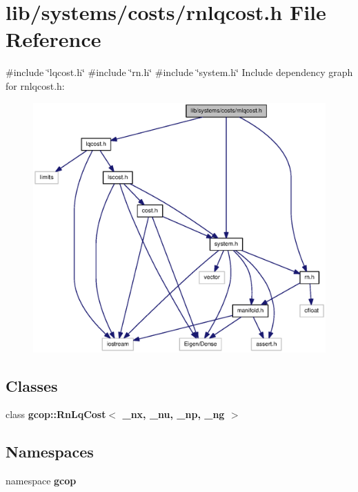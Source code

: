 \section{lib/systems/costs/rnlqcost.h \-File \-Reference}
\label{rnlqcost_8h}
{\ttfamily \#include \char`\"{}lqcost.\-h\char`\"{}}\*
{\ttfamily \#include \char`\"{}rn.\-h\char`\"{}}\*
{\ttfamily \#include \char`\"{}system.\-h\char`\"{}}\*
\-Include dependency graph for rnlqcost.\-h\-:\nopagebreak
\begin{figure}[H]
\begin{center}
\leavevmode
\includegraphics[width=350pt]{rnlqcost_8h__incl}
\end{center}
\end{figure}
\subsection*{\-Classes}
\begin{DoxyCompactItemize}
\item 
class {\bf gcop\-::\-Rn\-Lq\-Cost$<$ \-\_\-nx, \-\_\-nu, \-\_\-np, \-\_\-ng $>$}
\end{DoxyCompactItemize}
\subsection*{\-Namespaces}
\begin{DoxyCompactItemize}
\item 
namespace {\bf gcop}
\end{DoxyCompactItemize}
